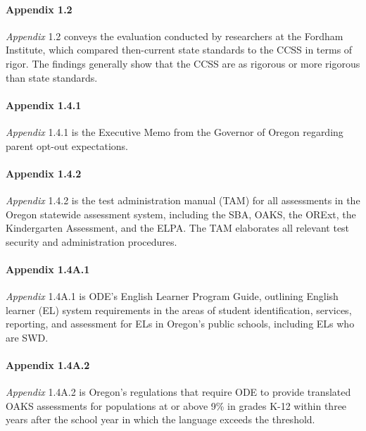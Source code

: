 \documentclass[]{article}
\let\oldparagraph\paragraph
\renewcommand{\paragraph}[1]{\oldparagraph{#1}\mbox{}}
\begin{document}
\paragraph{Appendix 1.2}\label{appendix-1.2}

\emph{Appendix} 1.2 conveys the evaluation conducted by researchers at
the Fordham Institute, which compared then-current state standards to
the CCSS in terms of rigor. The findings generally show that the CCSS
are as rigorous or more rigorous than state standards.

\paragraph{Appendix 1.4.1}\label{appendix-1.4.1}

\emph{Appendix} 1.4.1 is the Executive Memo from the Governor of Oregon
regarding parent opt-out expectations.

\paragraph{Appendix 1.4.2}\label{appendix-1.4.2}

\emph{Appendix} 1.4.2 is the test administration manual (TAM) for all
assessments in the Oregon statewide assessment system, including the
SBA, OAKS, the ORExt, the Kindergarten Assessment, and the ELPA. The TAM
elaborates all relevant test security and administration procedures.

\paragraph{Appendix 1.4A.1}\label{appendix-1.4a.1}

\emph{Appendix} 1.4A.1 is ODE's English Learner Program Guide, outlining
English learner (EL) system requirements in the areas of student
identification, services, reporting, and assessment for ELs in Oregon's
public schools, including ELs who are SWD.

\paragraph{Appendix 1.4A.2}\label{appendix-1.4a.2}

\emph{Appendix} 1.4A.2 is Oregon's regulations that require ODE to
provide translated OAKS assessments for populations at or above 9\% in
grades K-12 within three years after the school year in which the
language exceeds the threshold.
\end{document}
